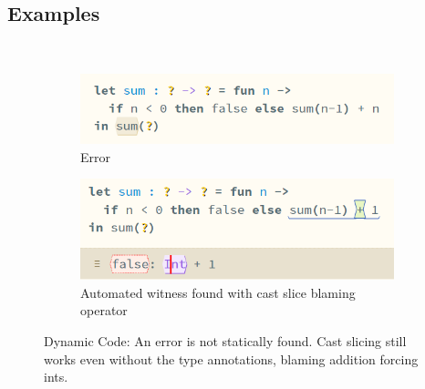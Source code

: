 \subsection{Examples}
\label{sec:EvalExamples}
\ 
\begin{figure}[H]
\centering
\begin{subfigure}{0.45\textwidth}
\includegraphics[width=1\textwidth]{Media/Figures/dynamic_code_error}
\caption{Error}
\end{subfigure}
\begin{subfigure}{0.45\textwidth}
\includegraphics[width=1\textwidth]{Media/Figures/dynamic_code_error_cast_slice}
\caption{Automated witness found with cast slice blaming \code{+} operator}
\end{subfigure}
\caption{Dynamic Code: An error is not statically found. Cast slicing still works even without the type annotations, blaming addition forcing ints.}
\label{fig:DynamicExample}
\end{figure}
